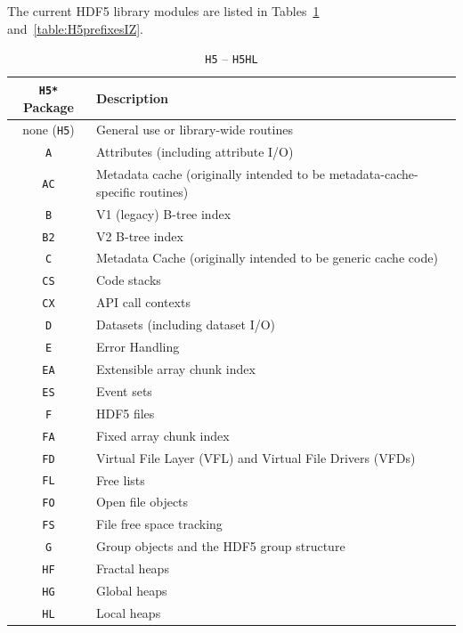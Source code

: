 The current HDF5 library modules are listed in Tables~\ref{table:H5prefixesAH} and~\ref{table:H5prefixesIZ}.


\begin{table}[h]
\begin{tabular}{||c|l||}
\hline
\textbf{\texttt{H5*} Package} & \textbf{Description} \\  [0.5ex] 
\hline\hline
none (\texttt{H5}) & General use or library-wide routines \\
\texttt{A} & Attributes (including attribute I/O) \\  
\texttt{AC} & Metadata cache (originally intended to be metadata-cache-specific routines) \\
\texttt{B} & V1 (legacy) B-tree index \\
\texttt{B2} & V2 B-tree index \\
\texttt{C} & Metadata Cache (originally intended to be generic cache code) \\
\texttt{CS} & Code stacks \\
\texttt{CX} & API call contexts \\
\texttt{D} & Datasets (including dataset I/O) \\
\texttt{E} & Error Handling \\
\texttt{EA} & Extensible array chunk index \\
\texttt{ES} & Event sets  \\
\texttt{F} & HDF5 files \\
\texttt{FA} & Fixed array chunk index \\
\texttt{FD} & Virtual File Layer (VFL) and Virtual File Drivers (VFDs) \\
\texttt{FL} & Free lists \\
\texttt{FO} & Open file objects  \\
\texttt{FS} & File free space tracking \\
\texttt{G} & Group objects and the HDF5 group structure \\
\texttt{HF} & Fractal heaps \\
\texttt{HG} & Global heaps \\
\texttt{HL} & Local heaps \\
\hline
\end{tabular}
\caption{\texttt{H5} -- \texttt{H5HL}}
\label{table:H5prefixesAH}
\end{table}

